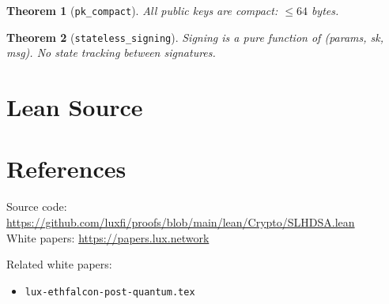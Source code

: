 \documentclass[11pt]{article}
\newtheorem{theorem}{Theorem}
\begin{document}
\begin{theorem}[\texttt{pk\_compact}]
All public keys are compact: $\leq 64$ bytes.
\end{theorem}

\begin{theorem}[\texttt{stateless\_signing}]
Signing is a pure function of (params, sk, msg). No state tracking between signatures.
\end{theorem}


\section{Lean Source}


\section{References}
\noindent Source code: \url{https://github.com/luxfi/proofs/blob/main/lean/Crypto/SLHDSA.lean}\\
\noindent White papers: \url{https://papers.lux.network}

\noindent Related white papers:
\begin{itemize}
  \item \texttt{lux-ethfalcon-post-quantum.tex}
\end{itemize}
\end{document}
